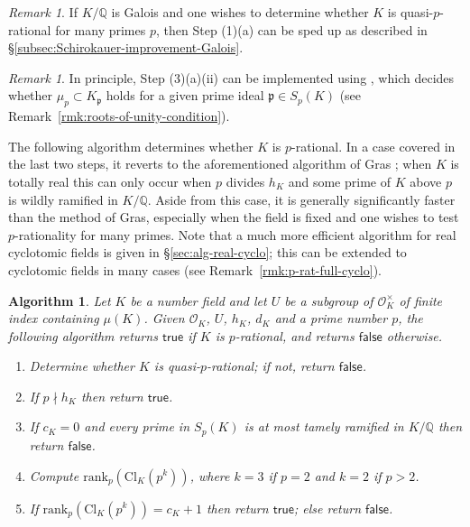 \documentclass[12pt, a4paper, usenames]{amsart}
\newcommand{\Q}{\mathbb{Q}}
\theoremstyle{plain}
\newtheorem{algorithm}[theorem]{Algorithm}
\theoremstyle{remark}
\newtheorem{remark}[theorem]{Remark}
\theoremstyle{definition}
\newcommand{\rank}{\mathrm{rank}}
\newcommand{\Cl}{\mathrm{Cl}}
\begin{document}
\begin{remark}\label{rmk:Galois-Shirokauer-many-primes}
If $K/\Q$ is Galois and one wishes to determine whether $K$ is quasi-$p$-rational 
for many primes $p$, then Step (1)(a) can be sped up as described in \S \ref{subsec:Schirokauer-improvement-Galois}.
\end{remark}

\begin{remark}
In principle, Step (3)(a)(ii) can be implemented using \cite[Algorithm~2]{MR5022766},
which decides whether $\mu_{p} \subset K_{\mathfrak{p}}$ holds for a given prime ideal $\mathfrak{p} \in S_p(K)$ (see Remark~\ref{rmk:roots-of-unity-condition}).
\end{remark}

The following algorithm determines whether $K$ is $p$-rational. 
In a case covered in the last two steps, it reverts to the 
aforementioned algorithm of Gras \cite{MR4491965}; 
when $K$ is totally real this can only occur when $p$ divides $h_{K}$
and some prime of $K$ above $p$ is wildly ramified in $K/\Q$.
Aside from this case, it is generally significantly faster than the 
method of Gras, especially when the field is fixed and one 
wishes to test $p$-rationality for many primes.
Note that a much more efficient algorithm for real cyclotomic fields
is given in \S \ref{sec:alg-real-cyclo}; this can be extended
to cyclotomic fields in many cases (see Remark~\ref{rmk:p-rat-full-cyclo}).


\begin{algorithm}\label{alg:p-rat}
Let $K$ be a number field and let $U$ be a subgroup of
$\mathcal{O}_{K}^{\times}$ of finite index containing $\mu(K)$.
Given $\mathcal{O}_{K}$, $U$, $h_{K}$, $d_{K}$
and a prime number $p$, the following algorithm returns 
\ensuremath{\mathsf{true}} if $K$ is $p$-rational, 
and returns \ensuremath{\mathsf{false}} otherwise. 
\renewcommand{\labelenumi}{(\arabic{enumi})}
\begin{enumerate} 
\item Determine whether $K$ is quasi-$p$-rational; if not, return \ensuremath{\mathsf{false}}.
\item If $p \nmid h_{K}$ then return \ensuremath{\mathsf{true}}.
\item If $c_{K}=0$ and every prime in $S_{p}(K)$ is at most tamely ramified in $K/\Q$
then return \ensuremath{\mathsf{false}}.
\item Compute $\rank_{p}(\Cl_{K}(p^{k}))$, where $k=3$ if $p=2$ and $k=2$ if $p>2$.
\item If $\rank_{p}(\Cl_{K}(p^{k})) = c_{K}+1$ then return \ensuremath{\mathsf{true}}; else return \ensuremath{\mathsf{false}}.
\end{enumerate}
\end{algorithm}
\end{document}
